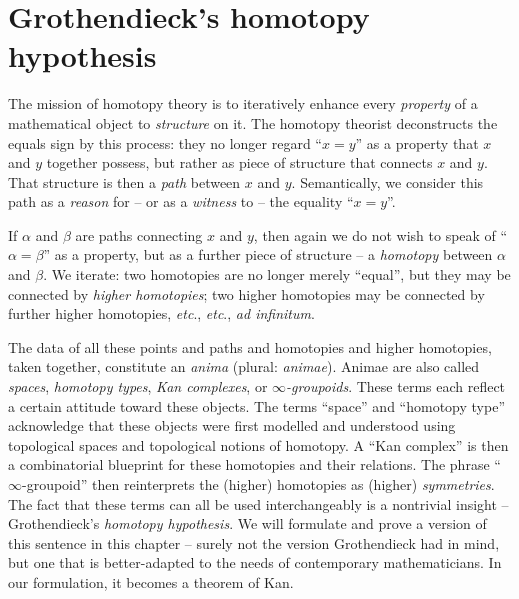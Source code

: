 
\chapter{Grothendieck's homotopy hypothesis}%
\label{cha:Grothendieckshomotopyhypothesis}

The mission of homotopy theory is to iteratively enhance every \emph{property} of a mathematical object to \emph{structure} on it.
The homotopy theorist deconstructs the equals sign by this process:
they no longer regard \enquote{$x = y$} as a property that $x$ and $y$ together possess,
but rather as piece of structure that connects $x$ and $y$.
That structure is then a \emph{path} between $x$ and $y$.
Semantically, we consider this path as a \emph{reason} for -- or as a \emph{witness} to -- the equality \enquote{$x = y$}.

If $\alpha$ and $\beta$ are paths connecting $x$ and $y$,
then again we do not wish to speak of \enquote{$\alpha = \beta$} as a property,
but as a further piece of structure -- a \emph{homotopy} between $\alpha$ and $\beta$.
We iterate: two homotopies are no longer merely \enquote{equal}, but they may be connected by \emph{higher homotopies};
two higher homotopies may be connected by further higher homotopies, \emph{etc}., \emph{etc}., \emph{ad infinitum}.

The data of all these points and paths and homotopies and higher homotopies, taken together, constitute an \emph{anima} (plural: \emph{animae}).
Animae are also called \emph{spaces}, \emph{homotopy types}, \emph{Kan complexes}, or \emph{$\infty$-groupoids}.
These terms each reflect a certain attitude toward these objects.
The terms \enquote{space} and \enquote{homotopy type} acknowledge that these objects were first modelled and understood using topological spaces and topological notions of homotopy.
A \enquote{Kan complex} is then a combinatorial blueprint for these homotopies and their relations.
The phrase \enquote{$\infty$-groupoid} then reinterprets the (higher) homotopies as (higher) \emph{symmetries}.
The fact that these terms can all be used interchangeably is a nontrivial insight -- Grothendieck's \emph{homotopy hypothesis}.
We will formulate and prove a version of this sentence in this chapter -- surely not the version Grothendieck had in mind,
but one that is better-adapted to the needs of contemporary mathematicians.
In our formulation, it becomes a theorem of Kan.

